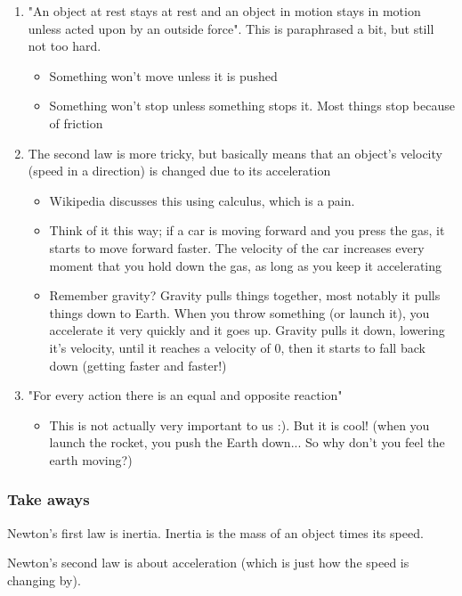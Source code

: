 \documentclass{article}
\begin{document}
\begin{enumerate}
	\item "An object at rest stays at rest and an object in motion stays in motion unless acted upon by an outside force". This is paraphrased a bit, but still not too hard.
	\begin{itemize}
		\item Something won't move unless it is pushed
		\item Something won't stop unless something stops it. Most things stop because of friction
	\end{itemize}
	\item The second law is more tricky, but basically means that an object's velocity (speed in a direction) is changed due to its acceleration
	\begin{itemize}
		\item Wikipedia discusses this using calculus, which is a pain.
		\item Think of it this way; if a car is moving forward and you press the gas, it starts to move forward faster. The velocity of the car increases every moment that you hold down the gas, as long as you keep it accelerating
		\item Remember gravity? Gravity pulls things together, most notably it pulls things down to Earth. When you throw something (or launch it), you accelerate it very quickly and it goes up. Gravity pulls it down, lowering it's velocity, until it reaches a velocity of 0, then it starts to fall back down (getting faster and faster!)
	\end{itemize}
	\item "For every action there is an equal and opposite reaction"
	\begin{itemize}
		\item This is not actually very important to us :). But it is cool! (when you launch the rocket, you push the Earth down... So why don't you feel the earth moving?)
	\end{itemize}
\end{enumerate}

\subsubsection{Take aways}

Newton's first law is inertia. Inertia is the mass of an object times its speed.

Newton's second law is about acceleration (which is just how the speed is changing by).
\end{document}
